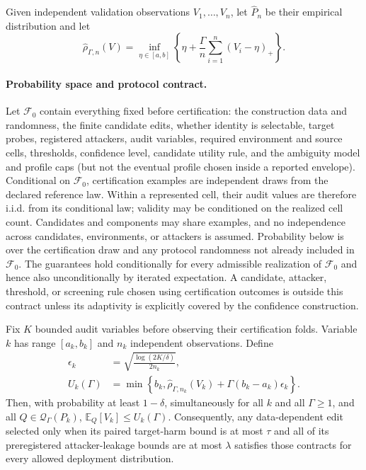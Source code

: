 Given independent validation observations $V_1,\ldots,V_n$, let $\widehat P_n$
be their empirical distribution and let
\begin{equation}
  \widehat\rho_{\Gamma,n}(V)
  =\inf_{\eta\in[a,b]}
  \left\{\eta+\frac{\Gamma}{n}\sum_{i=1}^n(V_i-\eta)_+\right\}.
\end{equation}

\paragraph{Probability space and protocol contract.}
Let $\mathcal F_0$ contain everything fixed before certification: the
construction data and randomness, the finite candidate edits, whether identity
is selectable, target probes, registered attackers, audit variables, required
environment and source cells, thresholds, confidence level, candidate utility
rule, and the ambiguity model and profile caps (but not the eventual profile
chosen inside a reported envelope). Conditional on
$\mathcal F_0$, certification examples are independent draws from the declared
reference law. Within a represented cell, their audit values are therefore
i.i.d. from its conditional law; validity may be conditioned on the realized
cell count. Candidates and components may share examples, and no independence
across candidates, environments, or attackers is assumed. Probability below is
over the certification draw and any protocol randomness not already included
in $\mathcal F_0$. The guarantees hold conditionally for every admissible
realization of $\mathcal F_0$ and hence also unconditionally by iterated
expectation. A candidate, attacker, threshold, or screening rule chosen using
certification outcomes is outside this contract unless its adaptivity is
explicitly covered by the confidence construction.

\begin{theorem}
\label{thm:robust-paired}
Fix $K$ bounded audit variables before observing their certification folds.
Variable $k$ has range $[a_k,b_k]$ and $n_k$ independent observations.  Define
\begin{equation}
\begin{aligned}
 \epsilon_k&=\sqrt{\frac{\log(2K/\delta)}{2n_k}},\\
 U_k(\Gamma)&=\min\left\{b_k,
 \widehat\rho_{\Gamma,n_k}(V_k)
 +\Gamma(b_k-a_k)\epsilon_k\right\}.
\end{aligned}
\end{equation}
Then, with probability at least $1-\delta$, simultaneously for all $k$ and
all $\Gamma\geq1$, and all $Q\in\mathcal{Q}_{\Gamma}(P_k)$,
$\mathbb{E}_Q[V_k]\leq U_k(\Gamma)$.
Consequently, any data-dependent edit selected only when its paired target-harm
bound is at most $\tau$ and all of its preregistered attacker-leakage bounds
are at most $\lambda$ satisfies those contracts for every allowed deployment
distribution.
\end{theorem}

